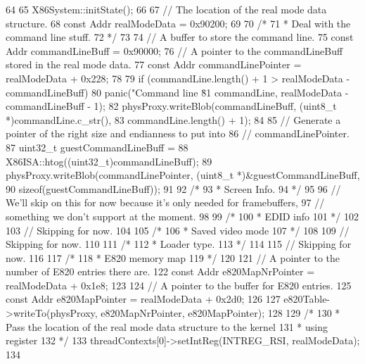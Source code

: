 \begin{DoxyCode}
64 {
65     X86System::initState();
66 
67     // The location of the real mode data structure.
68     const Addr realModeData = 0x90200;
69 
70     /*
71      * Deal with the command line stuff.
72      */
73 
74     // A buffer to store the command line.
75     const Addr commandLineBuff = 0x90000;
76     // A pointer to the commandLineBuff stored in the real mode data.
77     const Addr commandLinePointer = realModeData + 0x228;
78 
79     if (commandLine.length() + 1 > realModeData - commandLineBuff)
80         panic("Command line \"%
81                 commandLine, realModeData - commandLineBuff - 1);
82     physProxy.writeBlob(commandLineBuff, (uint8_t *)commandLine.c_str(),
83                         commandLine.length() + 1);
84 
85     // Generate a pointer of the right size and endianness to put into
86     // commandLinePointer.
87     uint32_t guestCommandLineBuff =
88         X86ISA::htog((uint32_t)commandLineBuff);
89     physProxy.writeBlob(commandLinePointer, (uint8_t *)&guestCommandLineBuff,
90                         sizeof(guestCommandLineBuff));
91 
92     /*
93      * Screen Info.
94      */
95 
96     // We'll skip on this for now because it's only needed for framebuffers,
97     // something we don't support at the moment.
98 
99     /*
100      * EDID info
101      */
102 
103     // Skipping for now.
104 
105     /*
106      * Saved video mode
107      */
108 
109     // Skipping for now.
110 
111     /*
112      * Loader type.
113      */
114 
115     // Skipping for now.
116 
117     /*
118      * E820 memory map
119      */
120 
121     // A pointer to the number of E820 entries there are.
122     const Addr e820MapNrPointer = realModeData + 0x1e8;
123 
124     // A pointer to the buffer for E820 entries.
125     const Addr e820MapPointer = realModeData + 0x2d0;
126 
127     e820Table->writeTo(physProxy, e820MapNrPointer, e820MapPointer);
128 
129     /*
130      * Pass the location of the real mode data structure to the kernel
131      * using register %
132      */
133     threadContexts[0]->setIntReg(INTREG_RSI, realModeData);
134 }
\end{DoxyCode}


